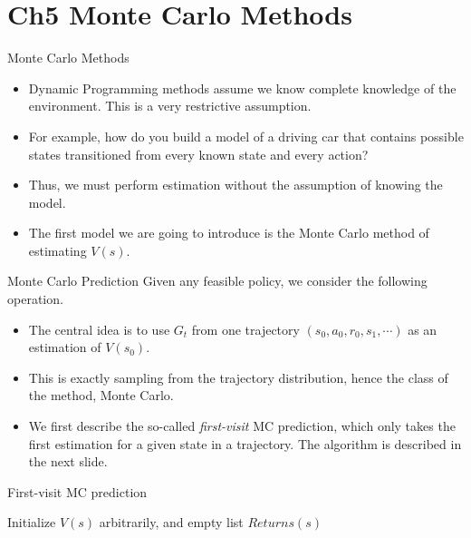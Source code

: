 \documentclass[handout]{beamer}
\begin{document}
\section{Ch5 Monte Carlo Methods}
\begin{frame}{Monte Carlo Methods}
\begin{itemize}[<+(1)->]
	\item Dynamic Programming methods assume we know complete knowledge of the environment. This is a very restrictive assumption. 
	\item For example, how do you build a model of a driving car that contains possible states transitioned from every known state and every action?
	\item Thus, we must perform estimation without the assumption of knowing the model.
	\item The first model we are going to introduce is the Monte Carlo method of estimating $V(s)$.
\end{itemize}

\end{frame}

\begin{frame}{Monte Carlo Prediction}
	\small
	Given any feasible policy, we consider the following operation.
	\begin{itemize}[<+(1)->]
		\item The central idea is to use $G_t$ from one trajectory $(s_0, a_0, r_0, s_1, \cdots)$ as an estimation of $V(s_0)$.
		\item This is exactly sampling from the trajectory distribution, hence the class of the method, Monte Carlo.
		\item We first describe the so-called \textit{first-visit} MC prediction, which only takes the first estimation for a given state in a trajectory. The algorithm is described in the next slide.
	\end{itemize}
\end{frame}

\begin{frame}{First-visit MC prediction}
	\small
	\begin{algorithm}[H]
	\caption{First-visit MC Prediction for given $\pi$}
	Initialize $V(s)$ arbitrarily, and empty list $Returns(s)$
	
	\end{algorithm}
\end{frame}
\end{document}
